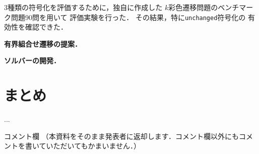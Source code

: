 \documentclass[a4j,10pt]{jarticle}
\newcommand{\code}[1]{\lstinline[basicstyle=\ttfamily]{#1}}
\begin{document}
\begin{multicols}{1}
3種類の符号化を評価するために，独自に作成した
$k$彩色遷移問題のベンチマーク問題90問を用いて
評価実験を行った．
その結果，特に\code{unchanged}符号化の
有効性を確認できた．

\textbf{有界組合せ遷移の提案．} 

\textbf{ソルバーの開発．}

\section{まとめ}



\begin{thebibliography}{10}

 ...

\end{thebibliography}

\end{multicols}
\vfill
\noindent
{\gt コメント欄}
{\footnotesize
（本資料をそのまま発表者に返却します．コメント欄以外にもコメントを書いていただいてもかまいません．）}
\\
\fbox{\begin{minipage}{\textwidth}\noindent\\\\\end{minipage}}	
\end{document}
